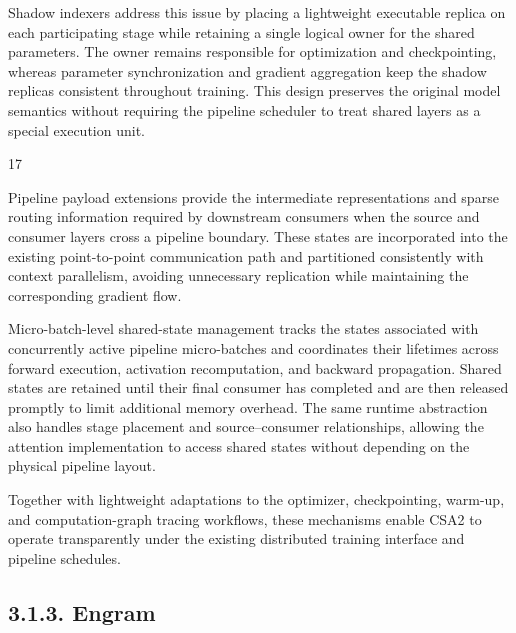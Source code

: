 \documentclass[
  10
]{article}
\begin{document}
Shadow indexers address this issue by placing a lightweight executable
replica on each participating stage while retaining a single logical
owner for the shared parameters. The owner remains responsible for
optimization and checkpointing, whereas parameter synchronization and
gradient aggregation keep the shadow replicas consistent throughout
training. This design preserves the original model semantics without
requiring the pipeline scheduler to treat shared layers as a special
execution unit.

17

Pipeline payload extensions provide the intermediate representations and
sparse routing information required by downstream consumers when the
source and consumer layers cross a pipeline boundary. These states are
incorporated into the existing point-to-point communication path and
partitioned consistently with context parallelism, avoiding unnecessary
replication while maintaining the corresponding gradient flow.

Micro-batch-level shared-state management tracks the states associated
with concurrently active pipeline micro-batches and coordinates their
lifetimes across forward execution, activation recomputation, and
backward propagation. Shared states are retained until their final
consumer has completed and are then released promptly to limit
additional memory overhead. The same runtime abstraction also handles
stage placement and source--consumer relationships, allowing the
attention implementation to access shared states without depending on
the physical pipeline layout.

Together with lightweight adaptations to the optimizer, checkpointing,
warm-up, and computation-graph tracing workflows, these mechanisms
enable CSA2 to operate transparently under the existing distributed
training interface and pipeline schedules.

\subsection{3.1.3. Engram}\label{engram-1}
\end{document}
